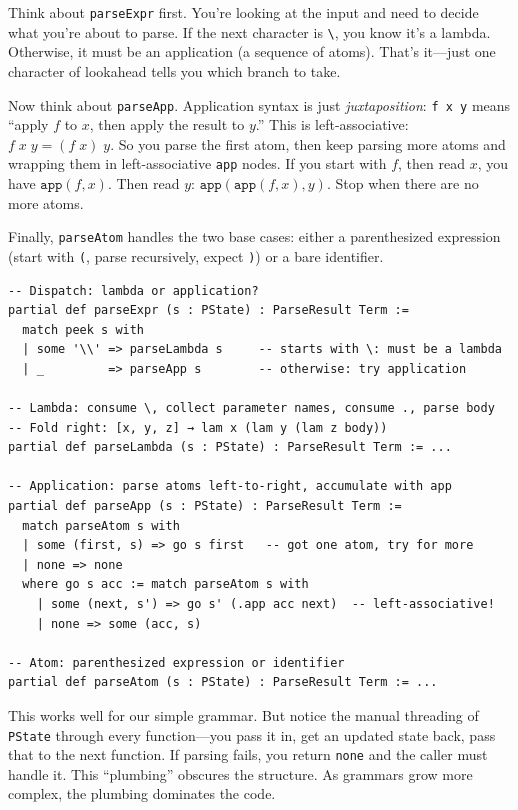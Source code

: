 \documentclass[11pt,a4paper]{article}
\theoremstyle{definition}
\begin{document}
Think about \texttt{parseExpr} first. You're looking at the input and need to
decide what you're about to parse. If the next character is \verb|\|, you know
it's a lambda. Otherwise, it must be an application (a sequence of atoms).
That's it---just one character of lookahead tells you which branch to take.

Now think about \texttt{parseApp}. Application syntax is just \emph{juxtaposition}:
\texttt{f x y} means ``apply $f$ to $x$, then apply the result to $y$.'' This
is left-associative: $f\;x\;y = (f\;x)\;y$. So you parse the first atom, then
keep parsing more atoms and wrapping them in left-associative \texttt{app} nodes.
If you start with $f$, then read $x$, you have $\texttt{app}(f, x)$. Then read $y$:
$\texttt{app}(\texttt{app}(f, x), y)$. Stop when there are no more atoms.

Finally, \texttt{parseAtom} handles the two base cases: either a parenthesized
expression (start with \texttt{(}, parse recursively, expect \texttt{)}) or a
bare identifier.

\begin{verbatim}
-- Dispatch: lambda or application?
partial def parseExpr (s : PState) : ParseResult Term :=
  match peek s with
  | some '\\' => parseLambda s     -- starts with \: must be a lambda
  | _         => parseApp s        -- otherwise: try application

-- Lambda: consume \, collect parameter names, consume ., parse body
-- Fold right: [x, y, z] → lam x (lam y (lam z body))
partial def parseLambda (s : PState) : ParseResult Term := ...

-- Application: parse atoms left-to-right, accumulate with app
partial def parseApp (s : PState) : ParseResult Term :=
  match parseAtom s with
  | some (first, s) => go s first   -- got one atom, try for more
  | none => none
  where go s acc := match parseAtom s with
    | some (next, s') => go s' (.app acc next)  -- left-associative!
    | none => some (acc, s)

-- Atom: parenthesized expression or identifier
partial def parseAtom (s : PState) : ParseResult Term := ...
\end{verbatim}

This works well for our simple grammar. But notice the manual threading of
\texttt{PState} through every function---you pass it in, get an updated state
back, pass that to the next function. If parsing fails, you return
\texttt{none} and the caller must handle it. This ``plumbing'' obscures the
structure. As grammars grow more complex, the plumbing dominates the code.
\end{document}
